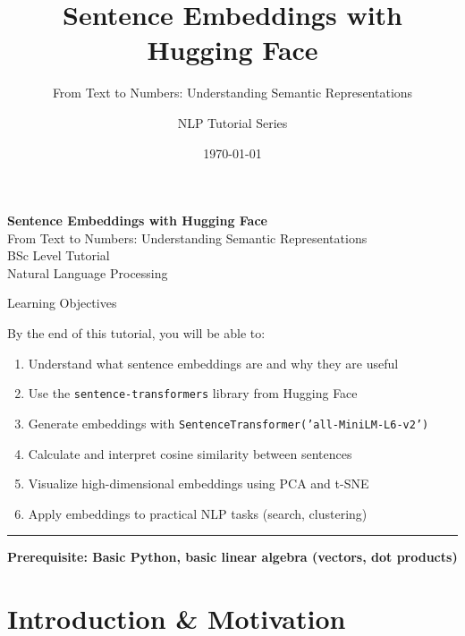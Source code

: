 \documentclass[8pt,aspectratio=169]{beamer}
\title{Sentence Embeddings with Hugging Face}
\subtitle{From Text to Numbers: Understanding Semantic Representations}
\author{NLP Tutorial Series}
\institute{BSc Level - Natural Language Processing}
\date{\today}
\newcommand{\bottomnote}[1]{%
\vfill
\vspace{-2mm}
\textcolor{mllavender2}{\rule{\textwidth}{0.4pt}}
\vspace{1mm}
\footnotesize
\textbf{#1}
}
\begin{document}
\begin{frame}[plain]
\vspace{1.5cm}
\begin{center}
{\Huge\textbf{Sentence Embeddings with Hugging Face}}\\[0.5cm]
{\Large From Text to Numbers: Understanding Semantic Representations}\\[2cm]
{\normalsize BSc Level Tutorial}\\[0.3cm]
{\normalsize Natural Language Processing}
\end{center}
\end{frame}

\begin{frame}[t]{Learning Objectives}

By the end of this tutorial, you will be able to:

\vspace{0.5cm}

\begin{enumerate}
    \item Understand what sentence embeddings are and why they are useful
    \item Use the \texttt{sentence-transformers} library from Hugging Face
    \item Generate embeddings with \texttt{SentenceTransformer('all-MiniLM-L6-v2')}
    \item Calculate and interpret cosine similarity between sentences
    \item Visualize high-dimensional embeddings using PCA and t-SNE
    \item Apply embeddings to practical NLP tasks (search, clustering)
\end{enumerate}

\bottomnote{Prerequisite: Basic Python, basic linear algebra (vectors, dot products)}
\end{frame}

\section{Introduction \& Motivation}
\end{document}
